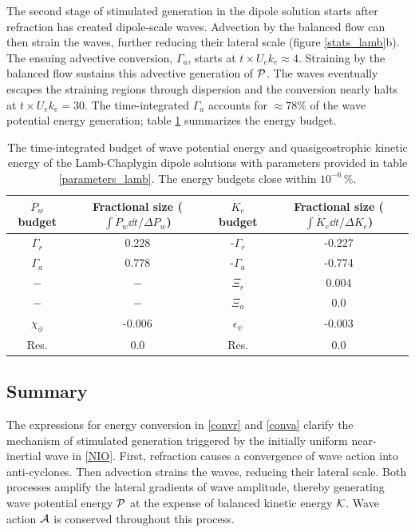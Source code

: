 \documentclass{jfm}
\newcommand{\NIW}{near-inertial wave}
\begin{document}
The second stage of stimulated generation in the dipole solution starts after
refraction has created dipole-scale waves. Advection by the balanced flow can then
strain the waves, further reducing their lateral scale (figure
\ref{stats_lamb}b). The ensuing advective conversion, $\Gamma_a$, starts
at $t\times U_e k_e \approx 4$. Straining by the balanced flow sustains this
advective generation of $\P$. The waves eventually
escapes the straining regions through dispersion and the conversion nearly halts at
$t\times U_e k_e = 30$.
The time-integrated $\Gamma_a$ accounts for $\approx 78\%$ of the
wave potential energy generation; table \ref{table1} summarizes  the energy budget.


%
\begin{table}
\begin{center}
    \caption{The time-integrated budget of wave potential energy and quasigeostrophic      kinetic energy of the Lamb-Chaplygin dipole solutions with parameters provided in table \ref{parameters_lamb}. The energy budgets close within $10^{-6}\,\%$.\label{table1}}
\begin{tabular}{c|c|c|c}
\hline
$\dot{P}_w$ budget & Fractional size ($\int\dot{P}_w \dd t/\Delta P_w $) & $\dot{K}_e$ budget  & Fractional size ($\int\dot{K}_e \dd t/\Delta K_e$)\\
\hline
$\Gamma_r$ & 0.228 & -$\Gamma_r$ & -0.227 \\
$\Gamma_a$ & 0.778 & -$\Gamma_a$ & -0.774 \\
$-$ & $-$ & $\Xi_r$ & 0.004 \\
$-$ & $-$ & $\Xi_a$ & 0.0 \\
$\chi_\phi$ & -0.006 & $\epsilon_\psi$ & -0.003 \\
Res. & 0.0 & Res. & 0.0 \\
\end{tabular}
\end{center}
\end{table}


\subsection{Summary}

The  expressions for energy conversion in \eqref{convr} and \eqref{conva} clarify the mechanism of stimulated generation triggered by  the initially uniform \NIW{} in \eqref{NIO}. First, refraction causes a convergence of wave action  into anti-cyclones. Then advection strains the waves, reducing their lateral scale. Both
processes amplify the lateral gradients of wave amplitude, thereby generating wave potential energy $\Pw$ at the expense of balanced kinetic energy $\K$. Wave action $\A$ is conserved throughout this process.
\end{document}
